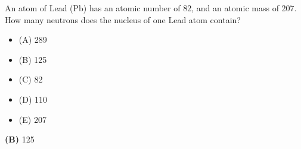 

An atom of Lead (Pb) has an atomic number of 82, and an atomic mass of 207.  How many neutrons does the nucleus of one Lead atom contain?

\begin{itemize}
\item{(A)} 289
\vskip 5pt 
\item{(B)} 125
\vskip 5pt 
\item{(C)} 82
\vskip 5pt 
\item{(D)} 110
\vskip 5pt 
\item{(E)} 207
\end{itemize}







{\bf (B)} 125
 










